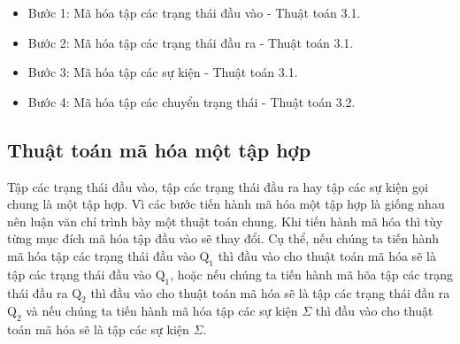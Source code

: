 \documentclass[a4paper,13pt,oneside,openany]{book}
\newenvironment{megaalgorithm}[1][htb]
{\renewcommand{\algorithmcfname}{Thuật toán}%
	\begin{algorithm}[#1]%
}{\end{algorithm}}
\begin{document}
\begin{flushleft}
		\begin{itemize}
			\item Bước 1: Mã hóa tập các trạng thái đầu vào - Thuật toán 3.1.
			\item Bước 2: Mã hóa tập các trạng thái đầu ra - Thuật toán 3.1.
			\item Bước 3: Mã hóa tập các sự kiện - Thuật toán 3.1.
			\item Bước 4: Mã hóa tập các chuyển trạng thái - Thuật toán 3.2.
		\end{itemize}
		
		\subsection{Thuật toán mã hóa một tập hợp}
		Tập các trạng thái đầu vào, tập các trạng thái đầu ra hay tập các sự kiện gọi chung là một tập hợp. Vì các bước tiến hành mã hóa một tập hợp là giống nhau nên luận văn chỉ trình bày một thuật toán chung. Khi tiến hành mã hóa thì tùy từng mục đích mã hóa tập đầu vào sẽ thay đổi. Cụ thể, nếu chúng ta tiến hành mã hóa tập các trạng thái đầu vào $\textrm{Q}_1$ thì đầu vào cho thuật toán mã hóa sẽ là tập các trạng thái đầu vào $\textrm{Q}_1$, hoặc nếu chúng ta tiến hành mã hõa tập các trạng thái đầu ra $\textrm{Q}_2$ thì đầu vào cho thuật toán mã hóa sẽ là tập các trạng thái đầu ra $\textrm{Q}_2$ và nếu chúng ta tiến hành mã hóa tập các sự kiện $\Sigma$ thì đầu vào cho thuật toán mã hóa sẽ là tập các sự kiện $\Sigma$.\\
		\begin{megaalgorithm}[H]
			\SetAlgoLined
			\DontPrintSemicolon
				

\end{megaalgorithm}
\end{flushleft}
\end{document}
